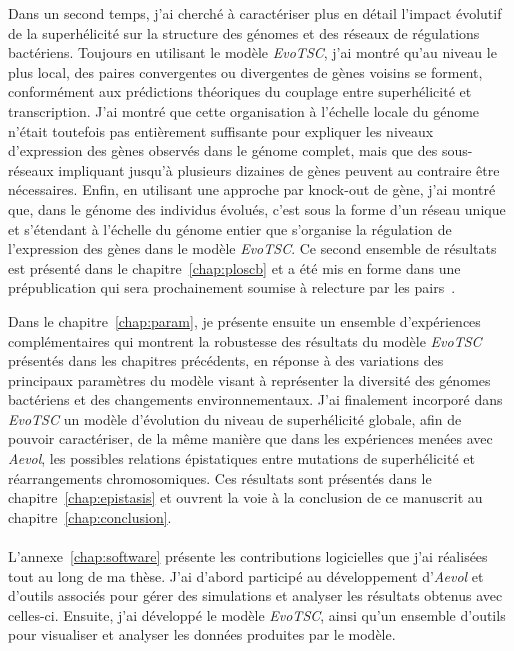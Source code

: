 Dans un second temps, j'ai cherché à caractériser plus en détail l'impact évolutif de la superhélicité sur la structure des génomes et des réseaux de régulations bactériens.
Toujours en utilisant le modèle \emph{EvoTSC}, j'ai montré qu'au niveau le plus local, des paires convergentes ou divergentes de gènes voisins se forment, conformément aux prédictions théoriques du couplage entre superhélicité et transcription.
J'ai montré que cette organisation à l'échelle locale du génome n'était toutefois pas entièrement suffisante pour expliquer les niveaux d'expression des gènes observés dans le génome complet, mais que des sous-réseaux impliquant jusqu'à plusieurs dizaines de gènes peuvent au contraire être nécessaires.
Enfin, en utilisant une approche par knock-out de gène, j'ai montré que, dans le génome des individus évolués, c'est sous la forme d'un réseau unique et s'étendant à l'échelle du génome entier que s'organise la régulation de l'expression des gènes dans le modèle \emph{EvoTSC}.
Ce second ensemble de résultats est présenté dans le chapitre~\ref{chap:ploscb} et a été mis en forme dans une prépublication qui sera prochainement soumise à relecture par les pairs~\citep{grohens2022b}.

Dans le chapitre~\ref{chap:param}, je présente ensuite un ensemble d'expériences complémentaires qui montrent la robustesse des résultats du modèle \emph{EvoTSC} présentés dans les chapitres précédents, en réponse à des variations des principaux paramètres du modèle visant à représenter la diversité des génomes bactériens et des changements environnementaux.
J'ai finalement incorporé dans \emph{EvoTSC} un modèle d'évolution du niveau de superhélicité globale, afin de pouvoir caractériser, de la même manière que dans les expériences menées avec \emph{Aevol}, les possibles relations épistatiques entre mutations de superhélicité et réarrangements chromosomiques.
Ces résultats sont présentés dans le chapitre~\ref{chap:epistasis} et ouvrent la voie à la conclusion de ce manuscrit au chapitre~\ref{chap:conclusion}.

\paragraph{}
L'annexe~\ref{chap:software} présente les contributions logicielles que j'ai réalisées tout au long de ma thèse.
J'ai d'abord participé au développement d'\emph{Aevol} et d'outils associés pour gérer des simulations et analyser les résultats obtenus avec celles-ci.
Ensuite, j'ai développé le modèle \emph{EvoTSC}, ainsi qu'un ensemble d'outils pour visualiser et analyser les données produites par le modèle.

